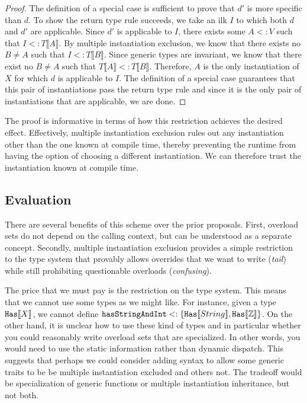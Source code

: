 \documentclass[preprint]{sigplanconf}
\newcommand{\ob}[1]{\ensuremath{\llbracket {#1} \rrbracket}}
\begin{document}
\begin{proof}
The definition of a special case is sufficient to prove that $d'$ is more specific
than $d$.  To show the return type rule succeeds, we take an ilk $I$ to which both $d$ and $d'$
are applicable.  Since $d'$ is applicable to $I$, there exists some $A <: V$ such that 
$I <: T\ob{A}$.  By multiple instantiation exclusion, we know that there exists no $B \not= A$
such that $I <: T\ob{B}$.  Since generic types are invariant, we know that there exist no
$B \not= A$ such that $T\ob{A} <: T\ob{B}$.  Therefore, $A$ is the only instantiation of $X$ for which 
$d$ is applicable to $I$.  The definition of a special case guarantees that this pair of
instantiations pass the return type rule and since it is the only pair of instantiations
that are applicable, we are done.
\end{proof}

The proof is informative in terms of how this restriction achieves the desired effect.
Effectively, multiple instantiation exclusion rules out any instantiation other than
the one known at compile time, thereby preventing the runtime from having the option
of choosing a different instantiation.  We can therefore trust the instantiation known at
compile time.

\subsection{Evaluation}

There are several benefits of this scheme over the prior proposals.  First, overload sets
do not depend on the calling context, but can be understood as a separate concept.
Secondly, multiple instantiation exclusion provides a simple restriction to the type system
that provably allows overrides that we want to write ({\it tail}) while still prohibiting questionable 
overloads ({\it confusing}).

The price that we must pay is the restriction on the type system.  This means that we cannot
use some types as we might like.  For instance, given a type ${\tt Has}\ob{X}$, we cannot
define ${\tt hasStringAndInt} <: \{ {\tt Has}\ob{String}, {\tt Has}\ob{\mathbb{Z}}\}$.  On the other
hand, it is unclear how to use these kind of types and in particular whether you could reasonably
write overload sets that are specialized.  In other words, you would need to use the static
information rather than dynamic dispatch.  This suggests that perhaps we could consider
adding syntax to allow some generic traits to be be multiple instantiation excluded and others
not.  The tradeoff would be specialization of generic functions or multiple instantiation inheritance,
but not both.
\end{document}
